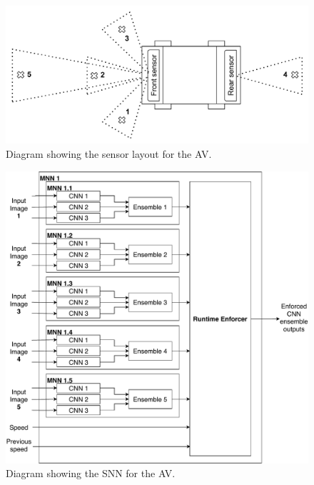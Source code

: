 \begin{figure}[t]
	\centering
	\includegraphics[width=\linewidth]{Content/fig/AV.pdf}
	\caption{Diagram showing the sensor layout for the \ac{AV}. \label{fig:av}}
\end{figure}

\begin{figure}[t]
	\centering
	\includegraphics[width=\linewidth]{Content/fig/AV-MNN.pdf}
	\caption{Diagram showing the \ac{SNN} for the \ac{AV}. \label{fig:avmnn}}
\end{figure}

